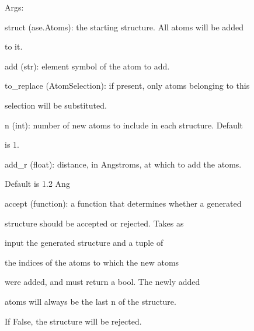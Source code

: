 \documentclass[letterpaper,10pt,english]{sphinxmanual}
\begin{document}
\begin{fulllineitems}
\begin{DUlineblock}{0em}
\item[] Args:
\item[]
\begin{DUlineblock}{\DUlineblockindent}
\item[] struct (ase.Atoms): the starting structure. All atoms will be added
\item[]
\begin{DUlineblock}{\DUlineblockindent}
\item[] to it.
\end{DUlineblock}
\item[] add (str): element symbol of the atom to add.
\item[] to\_replace (AtomSelection): if present, only atoms belonging to this
\item[]
\begin{DUlineblock}{\DUlineblockindent}
\item[] selection will be substituted.
\end{DUlineblock}
\item[] n (int): number of new atoms to include in each structure. Default
\item[]
\begin{DUlineblock}{\DUlineblockindent}
\item[] is 1.
\end{DUlineblock}
\item[] add\_r (float): distance, in Angstroms, at which to add the atoms.
\item[]
\begin{DUlineblock}{\DUlineblockindent}
\item[] Default is 1.2 Ang
\end{DUlineblock}
\item[] accept (function): a function that determines whether a generated
\item[]
\begin{DUlineblock}{\DUlineblockindent}
\item[] structure should be accepted or rejected. Takes as
\item[] input the generated structure and a tuple of
\item[] the indices of the atoms to which the new atoms
\item[] were added, and must return a bool. The newly added
\item[] atoms will always be the last n of the structure.
\item[] If False, the structure will be rejected.

\end{DUlineblock}
\end{DUlineblock}
\end{DUlineblock}
\end{fulllineitems}
\end{document}
